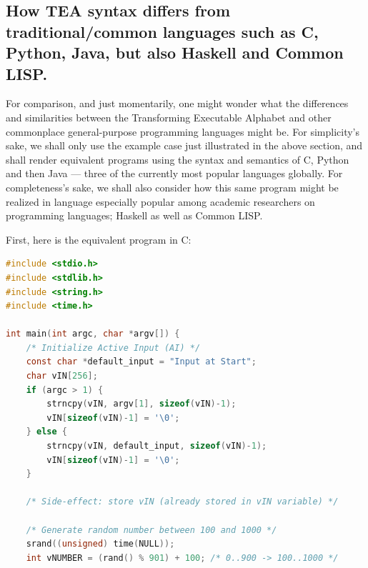 \documentclass[a4paper, 18pt]{book} %
\begin{document}
{{{\begin{appendices}
\subsection{How TEA syntax differs from traditional/common languages such as C, Python, Java, but also Haskell and Common LISP.}
\label{SECCOMPARETEATOLANG}


For comparison, and just momentarily, one might wonder what the differences and similarities between the Transforming Executable Alphabet and other commonplace general-purpose programming languages might be. For simplicity's sake, we shall only use the example case just illustrated in the above section, and shall render equivalent programs using the syntax and semantics of C, Python and then Java --- three of the currently most popular languages globally. For completeness's sake, we shall also consider how this same program might be realized in language especially popular among academic researchers on programming languages; Haskell as well as Common LISP.

\vspace{2em}

First, here is the equivalent program in C:


  \begin{tcolorbox}[myterminalstyle, title=C: TEA-like Sequence-Transformer Chaining Program Flow with String Template Processing, breakable]
\begin{lstlisting}[language=C,
backgroundcolor=\color{codebg},
basicstyle=\ttfamily\Large\color{codefg},
commentstyle=\color{comment}\itshape,
keywordstyle=\color{keyword}\bfseries,
stringstyle=\color{string},
showstringspaces=false,breaklines=true,frame=single]
#include <stdio.h>
#include <stdlib.h>
#include <string.h>
#include <time.h>

int main(int argc, char *argv[]) {
    /* Initialize Active Input (AI) */
    const char *default_input = "Input at Start";
    char vIN[256];
    if (argc > 1) {
        strncpy(vIN, argv[1], sizeof(vIN)-1);
        vIN[sizeof(vIN)-1] = '\0';
    } else {
        strncpy(vIN, default_input, sizeof(vIN)-1);
        vIN[sizeof(vIN)-1] = '\0';
    }

    /* Side-effect: store vIN (already stored in vIN variable) */

    /* Generate random number between 100 and 1000 */
    srand((unsigned) time(NULL));
    int vNUMBER = (rand() % 901) + 100; /* 0..900 -> 100..1000 */


\end{lstlisting}
\end{tcolorbox}
\end{appendices}}}}
\end{document}
